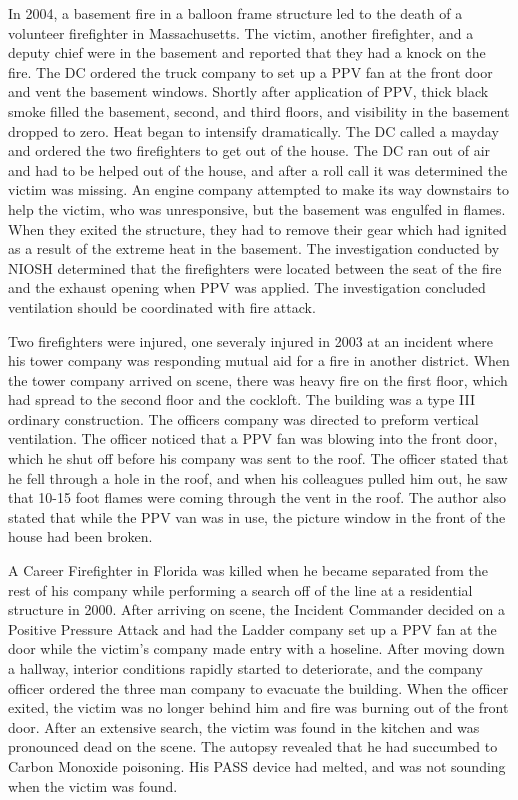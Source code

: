 \documentclass{article}
\begin{document}
In 2004, a basement fire in a balloon frame structure led to the death of a volunteer firefighter in Massachusetts. The victim, another firefighter, and a deputy chief were in the basement and reported that they had a knock on the fire. The DC ordered the truck company to set up a PPV fan at the front door and vent the basement windows. Shortly after application of PPV, thick black smoke filled the basement, second, and third floors, and visibility in the basement dropped to zero.  Heat began to intensify dramatically. The DC called a mayday and ordered the two firefighters to get out of the house. The DC ran out of air and had to be helped out of the house, and after a roll call it was determined the victim was missing. An engine company attempted to make its way downstairs to help the victim, who was unresponsive, but the basement was engulfed in flames. When they exited the structure, they had to remove their gear which had ignited as a result of the extreme heat in the basement. The investigation conducted by NIOSH determined that the firefighters were located between the seat of the fire and the exhaust opening when PPV was applied. The investigation concluded ventilation should be coordinated with fire attack.\cite{NIOSHF2004-02}

Two firefighters were injured, one severaly injured in 2003 at an incident where his tower company was responding mutual aid for a fire in another district. When the tower company arrived on scene, there was heavy fire on the first floor, which had spread to the second floor and the cockloft. The building was a type III ordinary construction. The officers company was directed to preform vertical ventilation. The officer noticed that a PPV fan was blowing into the front door, which he shut off before his company was sent to the roof. The officer stated that he fell through a hole in the roof, and when his colleagues pulled him out, he saw that 10-15 foot flames were coming through the vent in the roof. The author also stated that while the PPV van was in use, the picture window in the front of the house had been broken.\cite{GoldfelderCritCoord}

A Career Firefighter in Florida was killed when he became separated from the rest of his company while performing a search off of the line at a residential structure in 2000. After arriving on scene, the Incident Commander decided on a Positive Pressure Attack and had the Ladder company set up a PPV fan at the door while the victim’s company made entry with a hoseline. After moving down a hallway, interior conditions rapidly started to deteriorate, and the company officer ordered the three man company to evacuate the building. When the officer exited, the victim was no longer behind him and fire was burning out of the front door.  After an extensive search, the victim was found in the kitchen and was pronounced dead on the scene. The autopsy revealed that he had succumbed to Carbon Monoxide poisoning. His PASS device had melted, and was not sounding when the victim was found.\cite{NIOSHF2000_44}
	
\end{document}
